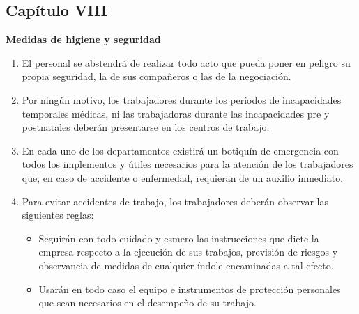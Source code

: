 \documentclass[11pt,letterpaper]{report}
\begin{document}
\subsection{Capítulo VIII}

\begin{center}
{\bf Medidas de higiene y seguridad}
\end{center}
\begin{enumerate}
\item El personal se abstendrá de realizar todo acto que pueda poner en peligro su propia seguridad, la de sus compañeros o las de la negociación.
\item Por ningún motivo, los trabajadores durante los períodos de incapacidades temporales médicas, ni las trabajadoras durante las incapacidades pre y postnatales deberán presentarse en los centros de trabajo.
\item En cada uno de los departamentos existirá un botiquín de emergencia con todos los implementos y útiles necesarios para la atención de los trabajadores que, en caso de accidente o enfermedad, requieran de un auxilio inmediato.
\item Para evitar accidentes de trabajo, los trabajadores deberán observar las siguientes reglas:
\begin{itemize}
\item Seguirán con todo cuidado y esmero las instrucciones que dicte la empresa respecto a la ejecución de sus trabajos, previsión de riesgos y observancia de medidas de cualquier índole encaminadas a tal efecto.
\item Usarán en todo caso el equipo e instrumentos de protección personales que sean necesarios en el desempeño de su trabajo.
\end{itemize}
\end{enumerate}
\end{document}
